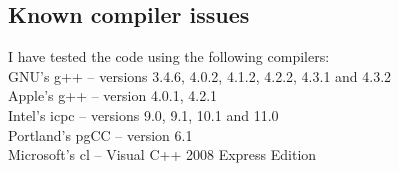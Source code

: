 \documentclass[twoside,letterpaper,11pt]{article}
\begin{document}
\subsection{Known compiler issues}
\label{compilerissues}















I have tested the code using the following compilers:\\
$\quad$\\
GNU's g++ -- versions 3.4.6, 4.0.2, 4.1.2, 4.2.2, 4.3.1 and 4.3.2\\
Apple's g++ -- version 4.0.1, 4.2.1 \\
Intel's icpc -- versions 9.0, 9.1, 10.1 and 11.0\\
Portland's pgCC -- version 6.1\\
Microsoft's cl -- Visual C++ 2008 Express Edition\\
\end{document}
